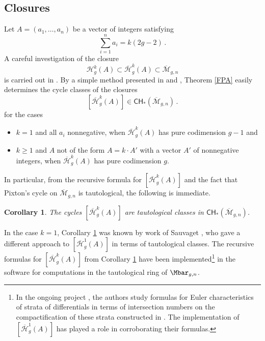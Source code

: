 \documentclass[a4paper,12pt]{article} %
\def\oM{\overline{\mathcal{M}}}
\def\HH{\mathcal{H}}
\theoremstyle{definition}
\theoremstyle{plain}%
\newtheorem{corollary}[definition]{Corollary}
\newcommand{\jocomment}[1]{}
\begin{document}
\subsection{Closures}\label{clozzz}
Let $A=(a_1,\ldots, a_n)$ be a vector of integers satisfying
$$\sum_{i=1}^n a_i =k(2g-2)\, .$$
A careful investigation of the closure%
$$\HH^k_g(A) \subset \overline{\HH}^k_g(A) \subset \oM_{g,n}$$
is carried out in \cite{Bainbridge2018Compactificatio, Bainbridge2019Strata-of-k-dif}.
By a simple method presented in \cite[Appendix A]{Farkas2016The-moduli-spac} and \cite[Section 3.4]{Schmitt2016Dimension-theor},
Theorem \ref{FPA} easily determines the cycle classes of the
closures
$$ [\overline{\HH}^k_g(A)] \in \mathsf{CH}_{*} (\oM_{g,n})\, .$$
for the cases 
\begin{itemize}
    \item $k=1$ and all $a_i$ nonnegative, when $\overline{\HH}^k_g(A)$ has pure codimension $g-1$ and
    \item $k\geq 1$ and $A$ not of the form $A = k \cdot A'$ with a vector $A'$ of nonnegative integers, when $\overline{\HH}^k_g(A)$ has pure codimension $g$. %
\end{itemize}
In particular, from the recursive formula for $[\overline{\HH}^k_g(A)]$ and the fact that Pixton's cycle on $\oM_{g,n}$ is tautological, the following is immediate.
\begin{corollary}\label{kk333}
The cycles $[\overline{\HH}^k_g(A)]$ are tautological classes in $\mathsf{CH}_*(\oM_{g,n})$.
\end{corollary}
In the case $k=1$, Corollary \ref{kk333} was known by work of Sauvaget  \cite{Sauvaget2017Cohomology-clas}, who gave a different approach to $[\overline{\HH}^1_g(A)]$ in terms of tautological classes.
The recursive formulas for $[\overline{\HH}^k_g(A)]$ from
Corollary \ref{kk333} have been implemented\footnote{In the ongoing project \cite{CMZ20}, the authors study formulas for Euler characteristics of strata of differentials in terms of intersection numbers on the compactification of these strata constructed in \cite{BCGGM3}. The
implementation of $[\overline{\HH}^1_g(A)]$ has played
a role in corroborating their formulas.}
in the software \cite{admcycles} for computations in the tautological ring of $\Mbar_{g,n}$.
\end{document}
